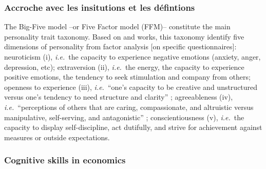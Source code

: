 \documentclass[a4paper, 11pt, onecolumn]{article}
\newcommand{\ie}{\textit{i.e.}}
\begin{document}
		\subsubsection{Accroche avec les insitutions et les défintions}

	

The Big-Five model --or Five Factor model (FFM)-- constitute the main personality trait taxonomy.
Based on \cite{Goldberg1981} and \cite{McCrae1987} works, this taxonomy identify five dimensions of personality from factor analysis [on specific questionnaires]: neuroticism (i), \ie~the capacity to experience negative emotions (anxiety, anger, depression, etc); extraversion (ii), \ie~the energy, the capacity to experience positive emotions, the tendency to seek stimulation and company from others; openness to experience (iii), \ie~``one’s capacity to be creative and unstructured versus one’s tendency to need structure and clarity'' \citep{Piedmont2014}; agreeableness (iv), \ie~``perceptions of others that are caring, compassionate, and altruistic versus manipulative, self-serving, and antagonistic'' \citep{Piedmont2014}; conscientiousness (v), \ie~the capacity to display self-discipline, act dutifully, and strive for achievement against measures or outside expectations.	
	
	
		\subsubsection{Cognitive skills in economics}
	
\end{document}
